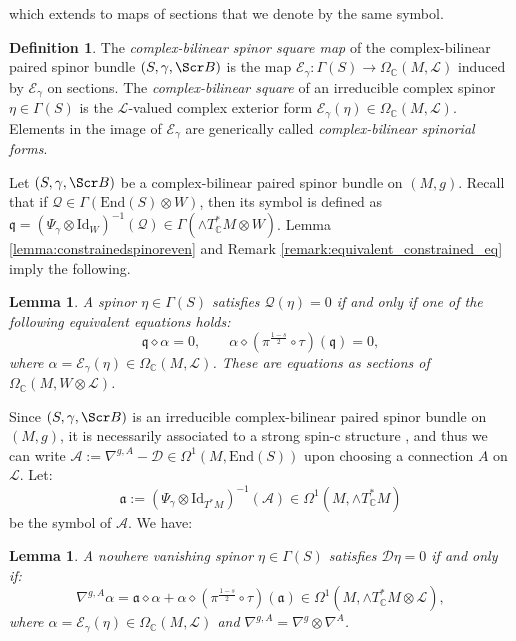 \documentclass[10pt,a4paper,twoside,reqno]{amsart}
\theoremstyle{plain}
\newtheorem{lemma}[thm]{Lemma}
\theoremstyle{definition}
\newtheorem{definition}[thm]{Definition}
\theoremstyle{remark}
\newcommand{\End}{\mathrm{End}}
\def\C{\mathbb{C}}
\def\cQ{\mathcal{Q}}
\def\Id{\mathrm{Id}}
\def\fra{\mathfrak{a}}
\def\frq{\mathfrak{q}}
\def\scB{\Scr B}
\def\cD{\mathcal{D}}
\def\cA{\mathcal{A}}
\def\cE{\mathcal{E}}
\def\cL{\mathcal{L}}
\begin{document}
which extends to maps of sections that we denote by the same symbol.

\begin{definition}
    The \emph{complex-bilinear spinor square map} of the complex-bilinear paired spinor bundle $(S,\gamma,\scB)$ is the map $\cE_\gamma\colon\Gamma(S)\to\Omega_\C(M,\cL)$ induced by $\cE_\gamma$ on sections. The \emph{complex-bilinear square} of an irreducible complex spinor $\eta\in\Gamma(S)$ is the $\cL$-valued complex exterior form $\cE_\gamma(\eta)\in\Omega_\C(M,\cL)$. Elements in the image of $\cE_\gamma$ are generically called \emph{complex-bilinear spinorial forms}.
\end{definition}

Let $(S,\gamma,\scB)$ be a complex-bilinear paired spinor bundle on $(M,g)$. Recall that if $\cQ\in\Gamma(\End(S)\otimes W)$, then its symbol is defined as $\frq=(\Psi_\gamma\otimes\Id_W)^{-1}(\cQ)\in\Gamma(\wedge T^*_\C M\otimes W)$. Lemma \ref{lemma:constrainedspinoreven} and Remark \ref{remark:equivalent_constrained_eq} imply the following.

\begin{lemma}\label{lemma:cx_bilinear_constrained_spinor}
    A spinor $\eta\in\Gamma(S)$ satisfies $\cQ(\eta)=0$ if and only if one of the following equivalent equations holds: $$\frq\diamond\alpha=0,\qquad\alpha\diamond(\pi^{\frac{1-s}{2}}\circ\tau)(\frq)=0,$$ where $\alpha=\cE_\gamma(\eta)\in\Omega_\C(M,\cL)$. These are equations as sections of $\Omega_\C(M,W\otimes\cL)$.
\end{lemma}

Since $(S,\gamma,\scB)$ is an irreducible complex-bilinear paired spinor bundle on $(M,g)$, it is necessarily associated to a strong spin-c structure \cite{FriedrichTrautman,LS18}, and thus we can write $\cA:=\nabla^{g,A}-\cD\in\Omega^1(M,\End(S))$ upon choosing a connection $A$ on $\cL$. Let: $$\fra:=(\Psi_\gamma\otimes\Id_{T^*M})^{-1}(\cA)\in\Omega^1(M,\wedge T^*_\C M)$$ be the symbol of $\cA$. We have:

\begin{lemma}
\label{lemma:complex_bilinear_parallel_spinor}
A nowhere vanishing spinor $\eta\in\Gamma(S)$ satisfies $\cD\eta=0$ if and only if: 
\begin{equation}
\label{eq:complex_bilinear_parallel_spinor}
\nabla^{g,A}\alpha=\fra\diamond\alpha+\alpha\diamond(\pi^{\frac{1-s}{2}}\circ\tau)(\fra) \in \Omega^1(M,\wedge T^*_\C M\otimes\cL),
\end{equation} 
where $\alpha=\cE_\gamma(\eta)\in\Omega_\C(M,\cL)$ and $\nabla^{g,A} = \nabla^g\otimes\nabla^{A}$.  
\end{lemma}
\end{document}
